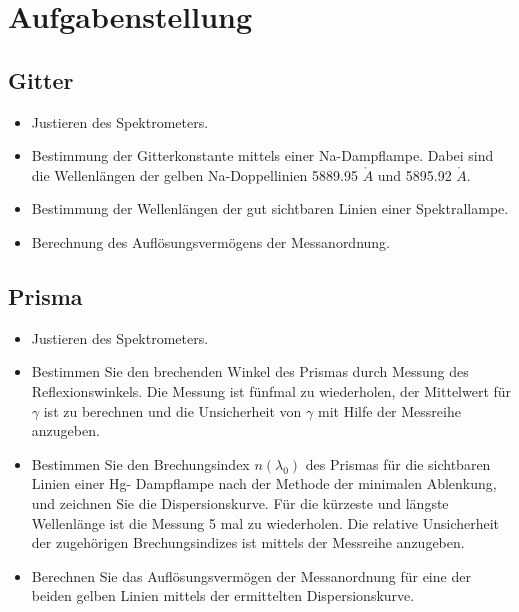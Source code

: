 \documentclass[11pt,ngerman]{scrartcl}
\begin{document}

\tableofcontents
\newpage

\section{Aufgabenstellung\label{Auf0}}

\subsection{Gitter}

\begin{itemize}
	\item Justieren des Spektrometers.

	\item Bestimmung der Gitterkonstante mittels einer Na-Dampflampe.
	      Dabei sind die Wellenlängen der gelben Na-Doppellinien 5889.95 $\mathring{A}$ und 5895.92 $\mathring{A}$.

	\item Bestimmung der Wellenlängen der gut sichtbaren Linien einer Spektrallampe.

	\item Berechnung des Auflösungsvermögens der Messanordnung.

\end{itemize}



\subsection{Prisma}

\begin{itemize}
	\item Justieren des Spektrometers.

	\item Bestimmen Sie den brechenden Winkel des Prismas durch Messung des Reflexionswinkels.
	      Die Messung ist fünfmal zu wiederholen, der Mittelwert für $\gamma$ ist zu berechnen und die
	      Unsicherheit von $\gamma$ mit Hilfe der Messreihe anzugeben.

	\item Bestimmen Sie den Brechungsindex $n(\lambda_0)$ des Prismas für die sichtbaren Linien einer Hg-
	      Dampflampe nach der Methode der minimalen Ablenkung, und zeichnen Sie die Dispersionskurve.
	      Für die kürzeste und längste Wellenlänge ist die Messung 5 mal zu wiederholen.
	      Die relative Unsicherheit der zugehörigen Brechungsindizes ist mittels der Messreihe anzugeben.

	\item Berechnen Sie das Auflösungsvermögen der Messanordnung für eine der beiden gelben
	      Linien mittels der ermittelten Dispersionskurve.

\end{itemize}
\end{document}
